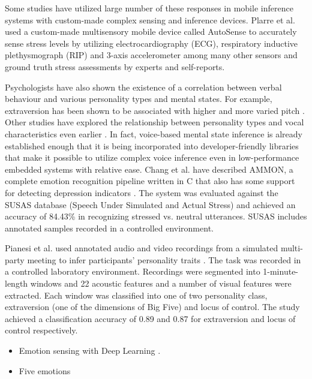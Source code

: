 Some studies have utilized large number of these responses in mobile
inference systems with custom-made complex sensing and inference devices.
Plarre et al. \cite{plarre11continuous} used a custom-made multisensory mobile
device called AutoSense \cite{ertin11autosense} to accurately sense stress
levels by utilizing
electrocardiography (ECG), respiratory inductive plethysmograph (RIP) and
3-axis accelerometer among many other sensors and ground truth stress
assessments by experts and self-reports.

Psychologists have also shown the existence of a correlation between
verbal behaviour and various personality types and mental states.
For example, extraversion
has been shown to be associated with higher and more varied pitch
\cite{scherer78personality}.
Other studies have explored the relationship between
personality types and vocal characteristics even earlier
\cite{addington68relationship}
\cite{aronovitch76voice}.
In fact, voice-based mental state inference is already established enough
that it is being incorporated into
developer-friendly libraries that make it possible to utilize complex
voice inference even in low-performance embedded systems with relative ease.
Chang et al. have described AMMON, a complete emotion recognition
pipeline written in C that also has some support for detecting depression
indicators
\cite{chang11hows}.
The system was evaluated against the SUSAS database (Speech Under Simulated
and Actual Stress) \cite{hansen97getting} and achieved an accuracy of 84.43\%
in recognizing stressed vs. neutral utterances. SUSAS includes annotated
samples recorded in a controlled environment.

Pianesi et al. used annotated audio and video recordings from a simulated
multi-party meeting to infer participants' personality traits
\cite{pianesi08multimodal}.
The task was recorded in a controlled laboratory environment.
Recordings were
segmented into 1-minute-length windows and 22 acoustic features and a number
of visual features were extracted. Each window was classified into one of two
personality class, extraversion (one of the dimensions of Big Five) and locus
of control. The study achieved a classification accuracy of 0.89 and 0.87
for extraversion and locus of control respectively.

\begin{itemize}
  \item Emotion sensing with Deep Learning \cite{han14speech}.
  \item Five emotions
\end{itemize}

